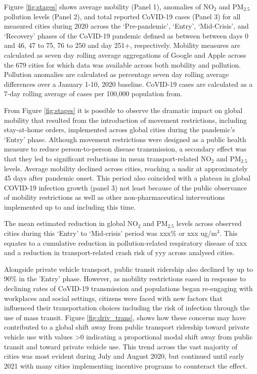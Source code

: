 \documentclass[preprint,12pt]{elsarticle}
\begin{document}
Figure \ref{fig:stages} shows average mobility (Panel 1), anomalies of NO$_{2}$ and PM$_{2.5}$ pollution levels (Panel 2), and total reported CoVID-19 cases (Panel 3) for all measured cities during 2020 across the `Pre-pandemic', `Entry', `Mid-Crisis', and `Recovery' phases of the CoVID-19 pandemic defined as between between days 0 and 46, 47 to 75, 76 to 250 and day 251+, respectively. Mobility measures are calculated as seven day rolling average aggregations of Google and Apple across the 679 cities for which data was available across both mobility and pollution. Pollution anomalies are calculated as percentage seven day rolling average differences over a January 1-10, 2020 baseline. CoVID-19 cases are calculated as a 7-day rolling average of cases per 100,000 population from\cite{Google2022}.

From Figure \ref{fig:stages} it is possible to observe the dramatic impact on global mobility that resulted from the introduction of movement restrictions, including stay-at-home orders, implemented across global cities during the pandemic's `Entry' phase\cite{hale2021global}. Although movement restrictions were designed as a public health measure to reduce person-to-person disease transmission, a secondary effect was that they led to significant reductions in mean transport-related NO$_{2}$ and PM$_{2.5}$ levels\cite{zhang2023impact}. Average mobility declined across cities, reaching a nadir at approximately 45 days after pandemic onset. This period also coincided with a plateau in global COVID-19 infection growth (panel 3) not least because of the public observance of mobility restrictions as well as other non-pharmaceutical interventions implemented up to and including this time\cite{hale2021global}. 

The mean estimated reduction in global NO$_{2}$ and PM$_{2.5}$ levels across observed cities during this `Entry' to `Mid-crisis' period was xxx\% or xxx ug/m$^{3}$. This equates to a cumulative reduction in pollution-related respiratory disease of xxx and a reduction in transport-related crash risk of yyy across analysed cities.

Alongside private vehicle transport, public transit ridership also declined by up to 90\% in the 'Entry' phase\cite{TransitCovid_Gkiotsalitis}. However, as mobility restrictions eased in response to declining rates of CoVID-19 transmission and populations began re-engaging with workplaces and social settings, citizens were faced with new factors that influenced their transportation choices including the risk of infection through the use of mass transit\cite{BECKTransit}. Figure \ref{fig:driv_trans}, shows how these concerns may have contributed to a global shift away from public transport ridership toward private vehicle use with values \textgreater 0 indicating a proportional modal shift away from public transit and toward private vehicle use. This trend across the vast majority of cities was most evident during July and August 2020, but continued until early 2021 with many cities implementing incentive programs to counteract the effect\cite{dai2021improving}.
\end{document}
